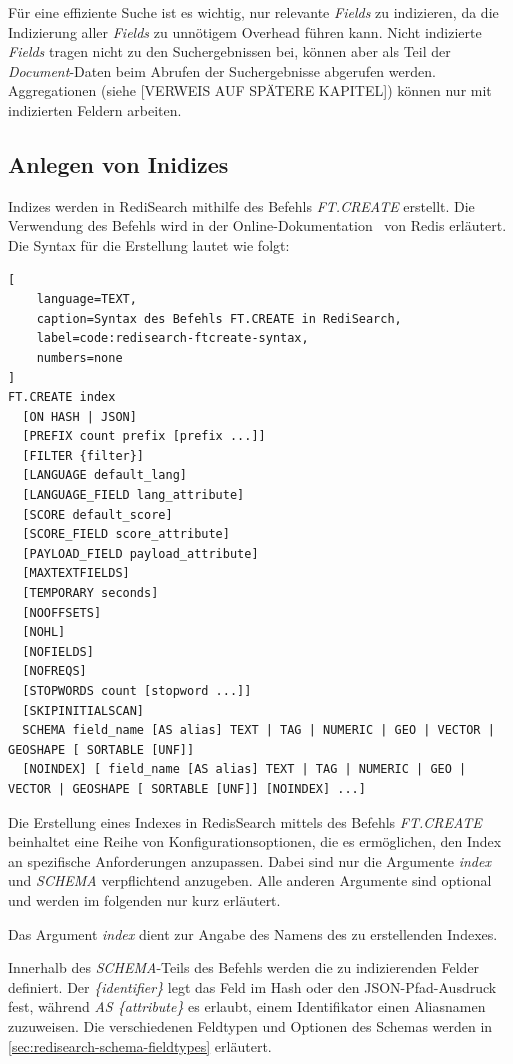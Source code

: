 Für eine effiziente Suche ist es wichtig, nur relevante \emph{Fields} zu indizieren, da die Indizierung aller \emph{Fields} zu unnötigem Overhead führen kann. Nicht indizierte \emph{Fields} tragen nicht zu den Suchergebnissen bei, können aber als Teil der \emph{Document}-Daten beim Abrufen der Suchergebnisse abgerufen werden. Aggregationen (siehe [VERWEIS AUF SPÄTERE KAPITEL]) können nur mit indizierten Feldern arbeiten. %

\subsection{Anlegen von Inidizes}
Indizes werden in RediSearch mithilfe des Befehls \emph{FT.CREATE} erstellt.
Die Verwendung des Befehls wird in der Online-Dokumentation~\cite{redis_ltd_ftcreate_nodate} von Redis erläutert.
Die Syntax für die Erstellung lautet wie folgt:
\begin{lstlisting}[
    language=TEXT,
    caption=Syntax des Befehls FT.CREATE in RediSearch,
    label=code:redisearch-ftcreate-syntax,
    numbers=none
]
FT.CREATE index 
  [ON HASH | JSON] 
  [PREFIX count prefix [prefix ...]] 
  [FILTER {filter}]
  [LANGUAGE default_lang] 
  [LANGUAGE_FIELD lang_attribute] 
  [SCORE default_score] 
  [SCORE_FIELD score_attribute] 
  [PAYLOAD_FIELD payload_attribute] 
  [MAXTEXTFIELDS] 
  [TEMPORARY seconds] 
  [NOOFFSETS] 
  [NOHL] 
  [NOFIELDS] 
  [NOFREQS] 
  [STOPWORDS count [stopword ...]] 
  [SKIPINITIALSCAN]
  SCHEMA field_name [AS alias] TEXT | TAG | NUMERIC | GEO | VECTOR | GEOSHAPE [ SORTABLE [UNF]] 
  [NOINDEX] [ field_name [AS alias] TEXT | TAG | NUMERIC | GEO | VECTOR | GEOSHAPE [ SORTABLE [UNF]] [NOINDEX] ...]
\end{lstlisting}

Die Erstellung eines Indexes in RedisSearch mittels des Befehls \emph{FT.CREATE} beinhaltet eine Reihe von Konfigurationsoptionen, die es ermöglichen, den Index an spezifische Anforderungen anzupassen.
Dabei sind nur die Argumente \emph{index} und \emph{SCHEMA} verpflichtend anzugeben. Alle anderen Argumente sind optional und werden im folgenden nur kurz erläutert.

Das Argument \emph{index} dient zur Angabe des Namens des zu erstellenden Indexes.

Innerhalb des \emph{SCHEMA}-Teils des Befehls werden die zu indizierenden Felder definiert. Der \emph{\{identifier\}} legt das Feld im Hash oder den JSON-Pfad-Ausdruck fest, während \emph{AS \{attribute\}} es erlaubt, einem Identifikator einen Aliasnamen zuzuweisen. Die verschiedenen Feldtypen und Optionen des Schemas werden in \ref{sec:redisearch-schema-fieldtypes} erläutert.


